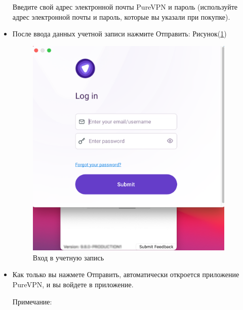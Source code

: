 \begin{itemize}
Введите свой адрес электронной почты PureVPN и пароль (используйте адрес электронной почты и пароль, которые вы указали при покупке).
\item После ввода данных учетной записи нажмите Отправить:  Рисунок(\ref{fig:30})
\begin{figure}[H]
\includegraphics[width=10cm]{25.png}
\centering
\caption{Вход в учетную запись}
\label{fig:30}
\end{figure}
\item Как только вы нажмете Отправить, автоматически откроется приложение PureVPN, и вы войдете в приложение.

Примечание:


\end{itemize}
